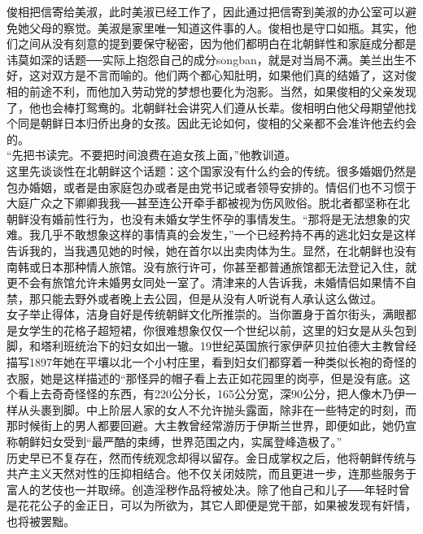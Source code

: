 俊相把信寄给美淑，此时美淑已经工作了，因此通过把信寄到美淑的办公室可以避免她父母的察觉。美淑是家里唯一知道这件事的人。俊相也是守口如瓶。其实，他们之间从没有刻意的提到要保守秘密，因为他们都明白在北朝鲜性和家庭成分都是讳莫如深的话题──实际上抱怨自己的成分songban，就是对当局不满。美兰出生不好，这对双方是不言而喻的。他们两个都心知肚明，如果他们真的结婚了，这对俊相的前途不利，而他加入劳动党的梦想也要化为泡影。当然，如果俊相的父亲发现了，他也会棒打鸳鸯的。北朝鲜社会讲究人们遵从长辈。俊相明白他父母期望他找个同是朝鲜日本归侨出身的女孩。因此无论如何，俊相的父亲都不会准许他去约会的。\\

“先把书读完。不要把时间浪费在追女孩上面，”他教训道。\\

这里先谈谈性在北朝鲜这个话题：这个国家没有什么约会的传统。很多婚姻仍然是包办婚姻，或者是由家庭包办或者是由党书记或者领导安排的。情侣们也不习惯于大庭广众之下卿卿我我──甚至连公开牵手都被视为伤风败俗。脱北者都坚称在北朝鲜没有婚前性行为，也没有未婚女学生怀孕的事情发生。“那将是无法想象的灾难。我几乎不敢想象这样的事情真的会发生，”一个已经矜持不再的逃北妇女是这样告诉我的，当我遇见她的时候，她在首尔以出卖肉体为生。显然，在北朝鲜也没有南韩或日本那种情人旅馆。没有旅行许可，你甚至都普通旅馆都无法登记入住，就更不会有旅馆允许未婚男女同处一室了。清津来的人告诉我，未婚情侣如果情不自禁，那只能去野外或者晚上去公园，但是从没有人听说有人承认这么做过。\\

女子举止得体，洁身自好是传统朝鲜文化所推崇的。当你置身于首尔街头，满眼都是女学生的花格子超短裙，你很难想象仅仅一个世纪以前，这里的妇女是从头包到脚，和塔利班统治下的妇女如出一辙。19世纪英国旅行家伊萨贝拉伯德大主教曾经描写1897年她在平壤以北一个小村庄里，看到妇女们都穿着一种类似长袍的奇怪的衣服，她是这样描述的“那怪异的帽子看上去正如花园里的岗亭，但是没有底。这个看上去奇奇怪怪的东西，有220公分长，165公分宽，深90公分，把人像木乃伊一样从头裹到脚。中上阶层人家的女人不允许抛头露面，除非在一些特定的时刻，而那时候街上的男人都要回避。大主教曾经常游历于伊斯兰世界，即便如此，她仍宣称朝鲜妇女受到“最严酷的束缚，世界范围之内，实属登峰造极了。”\\

历史早已不复存在，然而传统观念却得以留存。金日成掌权之后，他将朝鲜传统与共产主义天然对性的压抑相结合。他不仅关闭妓院，而且更进一步，连那些服务于富人的艺伎也一并取缔。创造淫秽作品将被处决。除了他自己和儿子──年轻时曾是花花公子的金正日，可以为所欲为，其它人即便是党干部，如果被发现有奸情，也将被罢黜。\\

